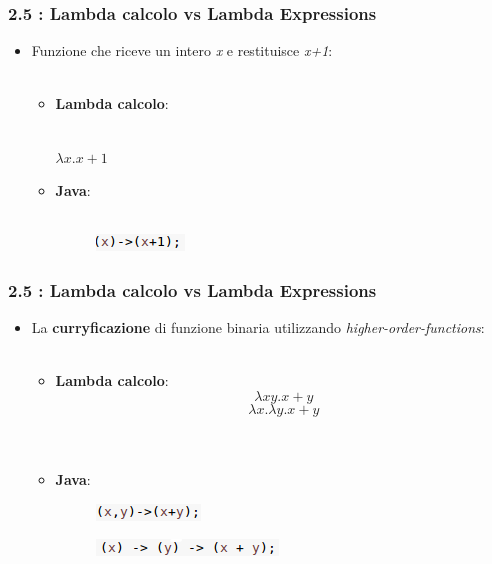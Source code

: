 \documentclass{beamer}
\begin{document}

\begin{frame}
	\frametitle{\textbf{2.5 : Lambda calcolo vs Lambda Expressions}}
	\begin{itemize}
		\item
			Funzione che riceve un intero \textit{x} e restituisce \textit{x+1}:\\\
		\begin{itemize}
			\item 
				\textbf{Lambda calcolo}:\\\
				\begin{center} 
					$\lambda x.x+1$ 
				\end{center}
			\item 
				\textbf{Java}:\\\
				\begin{figure}
					\centering
					\includegraphics[width=0.3\linewidth]{image/identity.png}
					\label{fig:identity}
				\end{figure}
		\end{itemize}
	\end{itemize}
\end{frame}


\begin{frame}
	\frametitle{\textbf{2.5 : Lambda calcolo vs Lambda Expressions}}
	\begin{itemize}
		\item
			La \textbf{curryficazione} di funzione binaria utilizzando \textit{higher-order-functions}:\\\
			\begin{itemize}
				\item 
					\textbf{Lambda calcolo}:
						\[
							\lambda xy.x+y
						\]
						\[
							\lambda x.\lambda y.x+y
						\]\\\
				\item 
					\textbf{Java}:
					\begin{figure}
						\centering
						\includegraphics[width=0.3\linewidth]{image/double.png}
						\label{fig:double}
					\end{figure}
					\begin{figure}
						\centering
						\includegraphics[width=0.4\linewidth]{image/curry.png}
						\label{fig:curry}
					\end{figure}
			\end{itemize}
	\end{itemize}
\end{frame}
\end{document}
